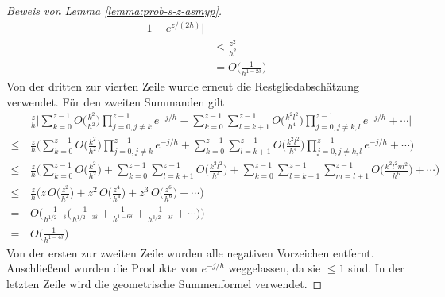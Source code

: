 \documentclass[a4paper, 11pt, ngerman]{article}
\theoremstyle{definition}
\theoremstyle{plain}
\theoremstyle{remark}
\begin{document}
\begin{proof}[Beweis von Lemma \ref{lemma:prob-s-z-asmyp}]
\begin{align*}
        1 - e^{z/(2h)}
        \Big \vert                                       \\
         & \le \frac {z^2} {h^2}                         \\
         & = O \bigg ( \frac 1 {h^{1 - 2\delta}} \bigg )
    \end{align*}
    Von der dritten zur vierten Zeile wurde erneut die Restgliedabschätzung verwendet. Für den zweiten Summanden gilt
    \begin{align*}
               & \frac z h \Bigg \vert
        \sum_{k = 0}^{z - 1} O \bigg ( \frac {k^2} {h^2} \bigg )
        \prod_{j = 0, j \ne k}^{z - 1} e^{-j/h}
        - \sum_{k = 0}^{z - 1}\sum_{l = k+1}^{z - 1}
        O \bigg ( \frac {k^2l^2} {h^4} \bigg )
        \prod_{j = 0, j \ne k,l}^{z - 1} e^{-j/h}
        + \cdots
        \Bigg \vert                                           \\
        \le \, & \frac z h \Bigg (
        \sum_{k = 0}^{z - 1} O \bigg ( \frac {k^2} {h^2} \bigg )
        \prod_{j = 0, j \ne k}^{z - 1} e^{-j/h}
        + \sum_{k = 0}^{z - 1}\sum_{l = k+1}^{z - 1}
        O \bigg ( \frac {k^2l^2} {h^4} \bigg )
        \prod_{j = 0, j \ne k,l}^{z - 1} e^{-j/h}
        + \cdots \Bigg )                                      \\
        \le \, & \frac z h \Bigg (
        \sum_{k = 0}^{z - 1} O \bigg ( \frac {k^2} {h^2} \bigg )
        + \sum_{k = 0}^{z - 1}\sum_{l = k+1}^{z - 1}
        O \bigg ( \frac {k^2l^2} {h^4} \bigg )
        + \sum_{k = 0}^{z - 1}\sum_{l = k+1}^{z - 1}\sum_{m = l + 1}^{z - 1}
        O \bigg ( \frac {k^2l^2m^2} {h^6} \bigg )
        + \cdots \Bigg )                                      \\
        \le \, & \frac z h \Bigg (
        z \, O \bigg ( \frac {z^2} {h^2} \bigg )
        + z^2 \, O \bigg ( \frac {z^4} {h^4} \bigg )
        + z^3 \, O \bigg ( \frac {z^6} {h^6} \bigg )
        + \cdots \Bigg )                                      \\
        = \,   & O \Bigg ( \frac 1 {h^{1/2 - \delta}} \bigg (
        \frac 1 {h^{1/2 - 3 \delta}} + \frac 1 {h^{1 - 6\delta}}
        + \frac 1 {h^{3/2 - 9\delta}} + \cdots
        \bigg ) \Bigg )                                       \\
        = \,   & O \bigg ( \frac 1 {h^{1 - 4\delta}} \bigg )
    \end{align*}
    Von der ersten zur zweiten Zeile wurden alle negativen Vorzeichen entfernt. Anschließend wurden die Produkte von $e^{-j/h}$ weggelassen, da sie $\le 1$ sind. In der letzten Zeile wird die geometrische Summenformel verwendet.
\end{proof}
\end{document}
